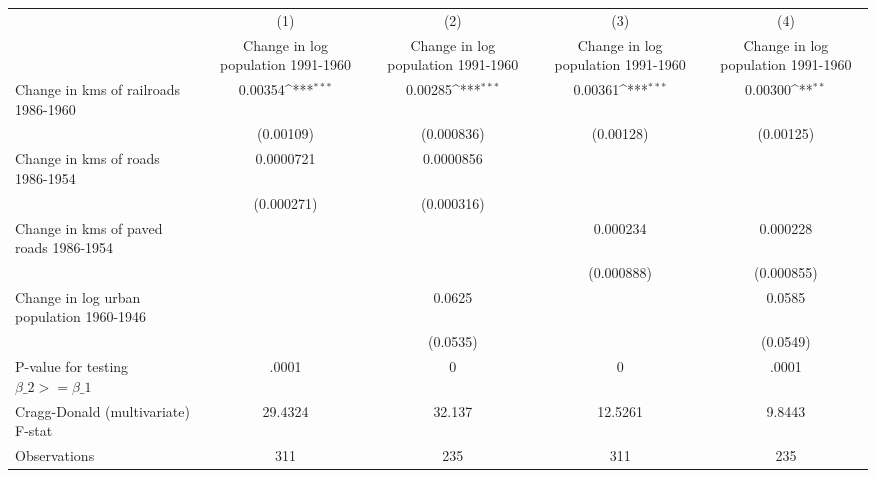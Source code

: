 {
\def\sym#1{\ifmmode^{#1}\else\(^{#1}\)\fi}
\begin{tabular}{l*{4}{c}}
\hline\hline
                &\multicolumn{1}{c}{(1)}&\multicolumn{1}{c}{(2)}&\multicolumn{1}{c}{(3)}&\multicolumn{1}{c}{(4)}\\
                &\multicolumn{1}{c}{Change in log population 1991-1960}&\multicolumn{1}{c}{Change in log population 1991-1960}&\multicolumn{1}{c}{Change in log population 1991-1960}&\multicolumn{1}{c}{Change in log population 1991-1960}\\
\hline
Change in kms of railroads 1986-1960&  0.00354\sym{***}&  0.00285\sym{***}&  0.00361\sym{***}&  0.00300\sym{**} \\
                &(0.00109)         &(0.000836)         &(0.00128)         &(0.00125)         \\
[1em]
Change in kms of roads 1986-1954&0.0000721         &0.0000856         &                  &                  \\
                &(0.000271)         &(0.000316)         &                  &                  \\
[1em]
Change in kms of paved roads 1986-1954&                  &                  & 0.000234         & 0.000228         \\
                &                  &                  &(0.000888)         &(0.000855)         \\
[1em]
Change in log urban population 1960-1946&                  &   0.0625         &                  &   0.0585         \\
                &                  & (0.0535)         &                  & (0.0549)         \\
\hline
P-value for testing $\beta\_{2} >= \beta\_{1}$&    .0001         &        0         &        0         &    .0001         \\
Cragg-Donald (multivariate) F-stat&  29.4324         &   32.137         &  12.5261         &   9.8443         \\
Observations    &      311         &      235         &      311         &      235         \\
\hline\hline
\end{tabular}
}
